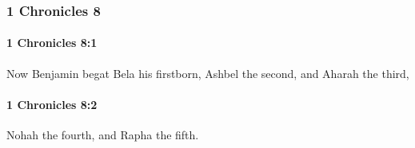 	\subsubsection{1 Chronicles 8} %
		\label{1CHRONICLES-8}

		\paragraph{1 Chronicles 8:1} %
			\label{1CHRONICLES-8-1}

			Now Benjamin begat Bela his firstborn, Ashbel the second, and Aharah the third,


		\paragraph{1 Chronicles 8:2} %
			\label{1CHRONICLES-8-2}

			Nohah the fourth, and Rapha the fifth.

